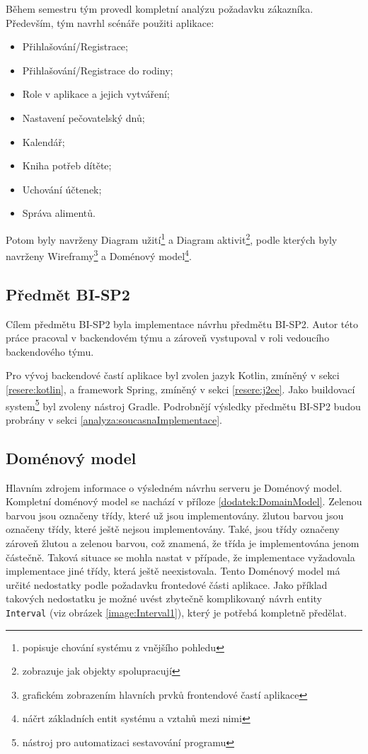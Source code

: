     Během semestru tým provedl kompletní analýzu požadavku zákazníka. Především, tým navrhl scénáře použiti aplikace:
    \begin{itemize}
	   \item Přihlašování/Registrace;
	   \item Přihlašování/Registrace do rodiny;
	   \item Role v aplikace a jejich vytváření;
	   \item Nastavení pečovatelský dnů;
	   \item Kalendář;
	   \item Kniha potřeb dítěte;
	   \item Uchování účtenek;
	   \item Správa alimentů.
	\end{itemize}
    Potom byly navrženy Diagram užití\footnote{popisuje chování systému z vnějšího pohledu} a Diagram aktivit\footnote{zobrazuje jak objekty spolupracují}, podle kterých byly navrženy Wireframy\footnote{grafickém zobrazením hlavních prvků frontendové častí aplikace} a Doménový model\footnote{náčrt základních entit systému a vztahů mezi nimi}. 
    
    \subsection{Předmět BI-SP2}\label{analyza:navrh:sp2}
        Cílem předmětu BI-SP2 byla implementace návrhu předmětu BI-SP2. Autor této práce pracoval v backendovém týmu a zároveň vystupoval v roli vedoucího backendového týmu.
        
        Pro vývoj backendové častí aplikace byl zvolen jazyk Kotlin, zmíněný v sekci \ref{resere:kotlin}, a framework Spring, zmíněný v sekci \ref{resere:j2ee}. Jako {buildovací system}\footnote{nástroj pro automatizaci sestavování programu} byl zvoleny nástroj Gradle. Podrobnějí výsledky předmětu BI-SP2 budou probrány v sekci \ref{analyza:soucasnaImplementace}.
        
    
    \subsection{Doménový model}\label{analyza:navrh:DomainModel}
        Hlavním zdrojem informace o výsledném návrhu serveru je Doménový model. Kompletní doménový model se nachází v příloze \ref{dodatek:DomainModel}. Zelenou barvou jsou označeny třídy, které už jsou implementovány. žlutou barvou jsou označeny třídy, které ještě nejsou implementovány. Také, jsou třídy označeny zároveň žlutou a zelenou barvou, což znamená, že třída je implementována jenom částečně. Taková situace se mohla nastat v případe, že implementace vyžadovala implementace jiné třídy, která ještě neexistovala. Tento Doménový model má určité nedostatky podle požadavku frontedové části aplikace. Jako příklad takových nedostatku je možné uvést zbytečně komplikovaný návrh entity \texttt{Interval} (viz obrázek \ref{image:Interval1}), který je potřebá kompletně předělat.

